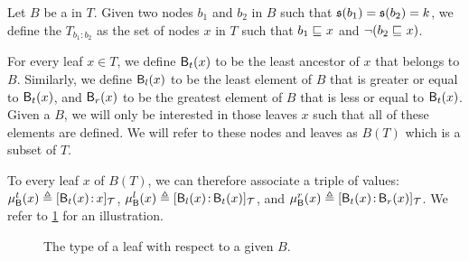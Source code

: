\AP Let $B$ be a  in $T$.
Given two nodes $b_1$ and $b_2$ in $B$ such that $\mathfrak{s}(b_1) = \mathfrak{s}(b_2) = k$,
we define the $T_{b_1:b_2}$ as the set of nodes $x$ in $T$ such that
$b_1 \treeleq x$ and $\neg (b_2 \treeleq x)$.

For every leaf $x \in T$, we
define $\mathop{\mathsf{B}_t}(x)$ to be the least ancestor of $x$ that belongs to $B$. Similarly,
we define $\mathop{\mathsf{B}_l}(x)$ to be the least element of $B$ that is greater or equal to
$\mathop{\mathsf{B}_t}(x)$, and $\mathop{\mathsf{B}_r}(x)$ to be the greatest element of $B$ that is less or equal
to $\mathop{\mathsf{B}_t}(x)$. Given a  $B$, we will only be interested in those leaves
$x$ such that all of these elements are defined. We will refer to these nodes
and leaves as $B(T)$ which is a subset of $T$.

To every leaf $x$ of $B(T)$, we can therefore associate a triple of values:
$\BtL(x) \defined \tlbl{\t}{\Bt(x)}{x}$, $\BlL(x) \defined
\tlbl{\t}{\Bl(x)}{\Bt(x)}$, and $\BrL(x) \defined \tlbl{\t}{\Bt(x)}{\Br(x)}$.
We refer to \cref{type-of-a-leaf-in-branch:fig}
for an
illustration.

\begin{figure}
    \centering
    \caption{The type of a leaf with respect to a given  $B$.}
    \label{type-of-a-leaf-in-branch:fig}
\end{figure}

